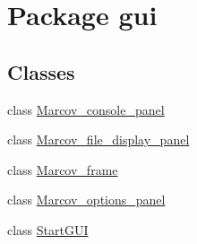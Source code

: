 \hypertarget{namespacegui}{}\section{Package gui}
\label{namespacegui}
\subsection*{Classes}
\begin{DoxyCompactItemize}
\item 
class \hyperlink{classgui_1_1_marcov__console__panel}{Marcov\+\_\+console\+\_\+panel}
\item 
class \hyperlink{classgui_1_1_marcov__file__display__panel}{Marcov\+\_\+file\+\_\+display\+\_\+panel}
\item 
class \hyperlink{classgui_1_1_marcov__frame}{Marcov\+\_\+frame}
\item 
class \hyperlink{classgui_1_1_marcov__options__panel}{Marcov\+\_\+options\+\_\+panel}
\item 
class \hyperlink{classgui_1_1_start_g_u_i}{Start\+G\+UI}
\end{DoxyCompactItemize}
